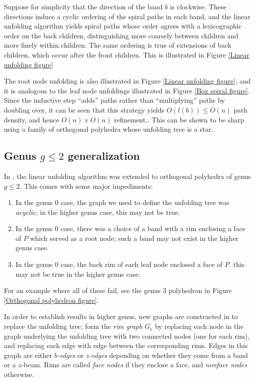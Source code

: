 \documentclass{article}
\begin{document}
Suppose for simplicity that the direction of the band $b$ is clockwise.
These directions induce a cyclic ordering of the spiral paths in each band, and the linear unfolding algorithm yields spiral paths whose order agrees with a lexicographic order on the back children, distinguishing more coarsely between children and more finely within children.
The same ordering is true of extensions of back children, which occur after the front children.
This is illustrated in Figure \ref{Linear unfolding figure}

The root node unfolding is also illustrated in Figure \ref{Linear unfolding figure}, and it is analogous to the leaf node unfoldings illustrated in Figure \ref{Box spiral figure}.
Since the inductive step ``adds'' paths rather than ``multiplying'' paths by doubling over, it can be seen that this strategy yields $O(l(b)) \leq O(n)$ path density, and hence $O(n) \times O(n)$ refinement..
This can be shown to be sharp using a family of orthogonal polyhedra whose unfolding tree is a star.

\subsection{Genus $g \leq 2$ generalization}\label{Linear nonzero subsection}
In \cite{Damian_Demaine}, the linear unfolding algorithm was extended to orthogonal polyhedra of genus $g \leq 2$.
This comes with some major impediments:
\begin{enumerate}
  \item In the genus 0 case, the graph we used to define the unfolding tree was \emph{acyclic};
    in the higher genus case, this may not be true.
  \item In the genus 0 case, there was a choice of a band with a rim enclosing a face of $P$ which served as a root node;
    such a band may not exist in the higher genus case.
  \item In the genus 0 case, the back rim of each leaf node enclosed a face of $P$.
    this may not be true in the higher genus case.
\end{enumerate}
For an example where all of these fail, see the genus 3 polyhedron in Figure \ref{Orthogonal polyhedron figure}.

In order to establish results in higher genus, new graphs are constructed in \cite{Damian_Demaine} to replace the unfolding tree;
form the \emph{rim graph} $G_r$ by replacing each node in the graph underlying the unfolding tree with two connected nodes (one for each rim), and replacing each edge with edge between the corresponding rims.
Edges in this graph are either \emph{$b$-edges} or \emph{$z$-edges} depending on whether they come from a band or a $z$-beam.
Rims are called \emph{face nodes} if they enclose a face, and \emph{nonface nodes} otherwise.
\end{document}
